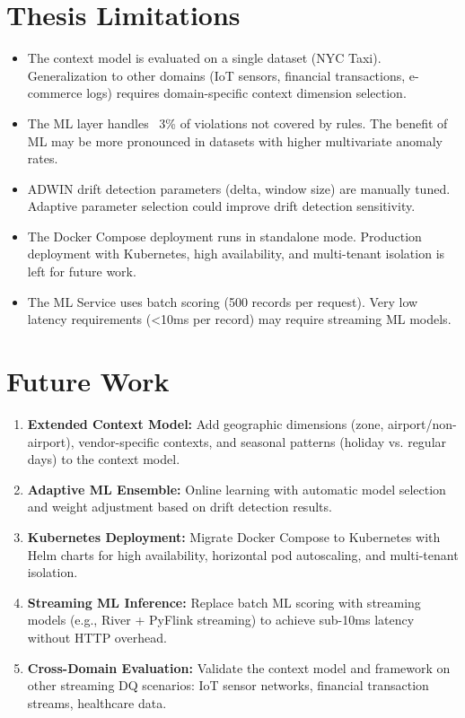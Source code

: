 \documentclass[a4paper, reqno, oneside]{book}
\begin{document}
\section{Thesis Limitations}

\begin{itemize}
    \item The context model is evaluated on a single dataset (NYC Taxi). Generalization to other domains (IoT sensors, financial transactions, e-commerce logs) requires domain-specific context dimension selection.
    \item The ML layer handles ~3\% of violations not covered by rules. The benefit of ML may be more pronounced in datasets with higher multivariate anomaly rates.
    \item ADWIN drift detection parameters (delta, window size) are manually tuned. Adaptive parameter selection could improve drift detection sensitivity.
    \item The Docker Compose deployment runs in standalone mode. Production deployment with Kubernetes, high availability, and multi-tenant isolation is left for future work.
    \item The ML Service uses batch scoring (500 records per request). Very low latency requirements (<10ms per record) may require streaming ML models.
\end{itemize}

\section{Future Work}

\begin{enumerate}
    \item \textbf{Extended Context Model:} Add geographic dimensions (zone, airport/non-airport), vendor-specific contexts, and seasonal patterns (holiday vs. regular days) to the context model.
    \item \textbf{Adaptive ML Ensemble:} Online learning with automatic model selection and weight adjustment based on drift detection results.
    \item \textbf{Kubernetes Deployment:} Migrate Docker Compose to Kubernetes with Helm charts for high availability, horizontal pod autoscaling, and multi-tenant isolation.
    \item \textbf{Streaming ML Inference:} Replace batch ML scoring with streaming models (e.g., River + PyFlink streaming) to achieve sub-10ms latency without HTTP overhead.
    \item \textbf{Cross-Domain Evaluation:} Validate the context model and framework on other streaming DQ scenarios: IoT sensor networks, financial transaction streams, healthcare data.
\end{enumerate}

\newpage
{}


\end{document}
